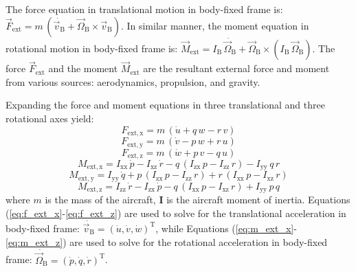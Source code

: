 \documentclass[lettersize,journal]{IEEEtran}
\begin{document}
The force equation in translational motion in body-fixed frame is: $\overrightarrow{F}_{\mathrm{ext}}=m\,\left(\dot{\overrightarrow{v}_{\mathrm{B}}} + \overrightarrow{\Omega}_{\mathrm{B}} \times \overrightarrow{v}_{\mathrm{B}} \right)$. In similar manner, the moment equation in rotational motion in body-fixed frame is: $\overrightarrow{M}_{\mathrm{ext}}=I_{\mathrm{B}}\,\dot{\overrightarrow{\Omega}_{\mathrm{B}}} + \overrightarrow{\Omega}_{\mathrm{B}} \times \left(I_{\mathrm{B}}\,\overrightarrow{\Omega}_{\mathrm{B}}\right)$. The force $\overrightarrow{F}_{\mathrm{ext}}$ and the moment $\overrightarrow{M}_{\mathrm{ext}}$ are the resultant external force and moment from various sources: aerodynamics, propulsion, and gravity.

Expanding the force and moment equations in three translational and three rotational axes yield:
\begin{equation}\label{eq:f_ext_x}
F_{\mathrm{ext,x}}=m\,\left(\dot{u}+q\,w-r\,v\right)
\end{equation}
\begin{equation}\label{eq:f_ext_y}
F_{\mathrm{ext,y}}=m\,\left(\dot{v}-p\,w+r\,u\right)
\end{equation}
\begin{equation}\label{eq:f_ext_z}
F_{\mathrm{ext,z}}=m\,\left(\dot{w}+p\,v-q\,u\right)
\end{equation}
\begin{equation}\label{eq:m_ext_x}
M_{\mathrm{ext,x}}=I_{\mathrm{xx}}\,\dot{p}-I_{\mathrm{xz}}\,\dot{r}-q\,\left(I_{\mathrm{zx}}\,p-I_{\mathrm{zz}}\,r\right)-I_{\mathrm{yy}}\,q\,r
\end{equation}
\begin{equation}\label{eq:m_ext_y}
M_{\mathrm{ext,y}}=I_{\mathrm{yy}}\,\dot{q}+p\,\left(I_{\mathrm{zx}}\,p-I_{\mathrm{zz}}\,r\right)+r\,\left(I_{\mathrm{xx}}\,p-I_{\mathrm{xz}}\,r\right)
\end{equation}
\begin{equation}\label{eq:m_ext_z}
M_{\mathrm{ext,z}}=I_{\mathrm{zz}}\,\dot{r}-I_{\mathrm{zx}}\,\dot{p}-q\,\left(I_{\mathrm{xx}}\,p-I_{\mathrm{xz}}\,r\right)+I_{\mathrm{yy}}\,p\,q
\end{equation}
where $m$ is the mass of the aircraft, $\boldsymbol{I}$ is the aircraft moment of inertia. Equations (\ref{eq:f_ext_x}-\ref{eq:f_ext_z}) are used to solve for the translational acceleration in body-fixed frame: $\dot{\overrightarrow{v}_{\mathrm{B}}}=(\dot{u}, \dot{v}, \dot{w})^\mathrm{T}$, while Equations (\ref{eq:m_ext_x}-\ref{eq:m_ext_z}) are used to solve for the rotational acceleration in body-fixed frame: $\dot{\overrightarrow{\Omega}_{\mathrm{B}}}=(\dot{p}, \dot{q}, \dot{r})^\mathrm{T}$.
\end{document}
